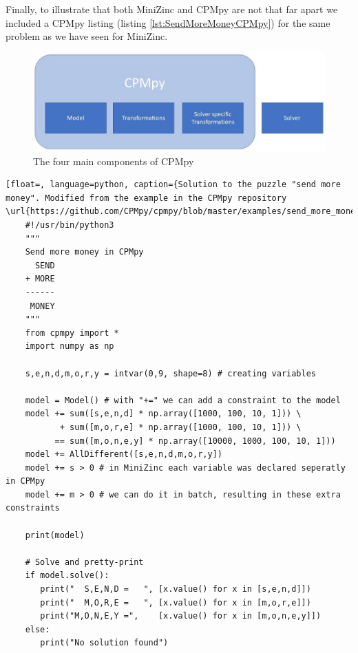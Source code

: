 Finally, to illustrate that both MiniZinc and CPMpy are not that far apart we included a CPMpy listing (listing \ref{lst:SendMoreMoneyCPMpy}) for the same problem as we have seen for MiniZinc.

\begin{figure}
	\centering
	\includegraphics[width=1.0\textwidth]{images/4componentsOfCPMpy}
	\caption{The four main components of CPMpy}
	\label{fig:4ComponentsOfCPMpy}
\end{figure}


\label{lst:SendMoreMoneyCPMpy}
\begin{lstlisting}[float=, language=python, caption={Solution to the puzzle "send more money". Modified from the example in the CPMpy repository \url{https://github.com/CPMpy/cpmpy/blob/master/examples/send_more_money.py}}]
	#!/usr/bin/python3
	"""
	Send more money in CPMpy
	  SEND
	+ MORE
	------
	 MONEY
	"""
	from cpmpy import *
	import numpy as np
	
	s,e,n,d,m,o,r,y = intvar(0,9, shape=8) # creating variables
	
	model = Model() # with "+=" we can add a constraint to the model
	model += sum([s,e,n,d] * np.array([1000, 100, 10, 1])) \
	       + sum([m,o,r,e] * np.array([1000, 100, 10, 1])) \
	      == sum([m,o,n,e,y] * np.array([10000, 1000, 100, 10, 1]))
	model += AllDifferent([s,e,n,d,m,o,r,y])
	model += s > 0 # in MiniZinc each variable was declared seperatly in CPMpy 
	model += m > 0 # we can do it in batch, resulting in these extra constraints 
	
	print(model)
	
	# Solve and pretty-print
	if model.solve():
	   print("  S,E,N,D =   ", [x.value() for x in [s,e,n,d]])
	   print("  M,O,R,E =   ", [x.value() for x in [m,o,r,e]])
	   print("M,O,N,E,Y =",    [x.value() for x in [m,o,n,e,y]])
	else:
	   print("No solution found")
\end{lstlisting}


